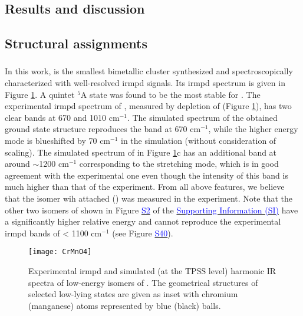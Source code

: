 \begin{refsection}
\section{Results and discussion}

\subsection{Structural assignments}

\subsubsection{}
	
In this work,  is the smallest bimetallic cluster synthesized and spectroscopically characterized with well-resolved \acrshort{irmpd} signals. Its \acrshort{irmpd} spectrum is given in Figure \ref{fig:CrMnOx}. A quintet $^5$A state was found to be the most stable for . The experimental \acrshort{irmpd} spectrum of , measured by depletion of  (Figure \ref{fig:CrMnOx}), has two clear bands at 670 and 1010 cm$^{-1}$. The simulated spectrum of the obtained ground state structure reproduces the band at 670 cm$^{-1}$, while the higher energy mode is blueshifted by 70 cm$^{-1}$ in the simulation (without consideration of scaling). The simulated spectrum of  in Figure \ref{fig:CrMnOx}c has an additional band at around $\sim$1200 cm$^{-1}$ corresponding to the  stretching mode, which is in good agreement with the experimental one even though the intensity of this band is much higher than that of the experiment. From all above features, we believe that the  isomer wih attached  () was measured in the experiment. Note that the other two isomers of  shown in Figure \href{https://github.com/phamlenhan/PhDDissertation/blob/master/Chapter-8SI-Nhan-thesis-CrMnO.pdf}{\textcolor{blue}{S2}}\commenttext{\ref{SI:figs:CrMnO4}} of the \href{https://github.com/phamlenhan/PhDDissertation/blob/master/Chapter-8SI-Nhan-thesis-CrMnO.pdf}{\textcolor{blue}{Supporting Information (SI)}} have a significantly higher relative energy and cannot reproduce the experimental \acrshort{irmpd} bands of < 1100 cm$^{-1}$ (see Figure \href{https://github.com/phamlenhan/PhDDissertation/blob/master/Chapter-8SI-Nhan-thesis-CrMnO.pdf}{\textcolor{blue}{S40}}\commenttext{\ref{SI:figs:CrMnO4-spec-si}}).


\begin{figure}
	\centering
	\texttt{[image: CrMnO4]}
	\caption{Experimental \acrshort{irmpd} and simulated (at the TPSS level) harmonic IR spectra of low-energy isomers of . The geometrical structures of selected low-lying states are given as inset with chromium (manganese) atoms represented by blue (black) balls.}
	\label{fig:CrMnOx}
\end{figure}


\end{refsection}
